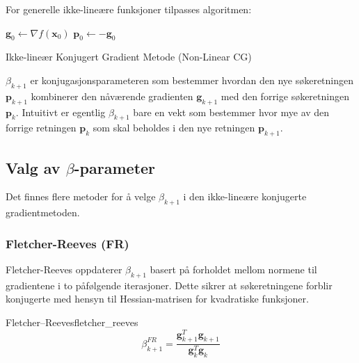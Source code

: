 For generelle ikke-lineære funksjoner tilpasses algoritmen:

\begin{algorithm}[H]
	\SetAlgoLined
	\(\symbf{g}_0 \gets \nabla f(\symbf{x}_0)\) 
	\(\symbf{p}_0 \gets -\symbf{g}_0\) 
	\caption{Ikke-lineær Konjugert Gradient Metode (Non-Linear CG)}
\end{algorithm}

\(\beta_{k+1}\) er konjugasjonsparameteren som bestemmer hvordan den nye søkeretningen \(\symbf{p}_{k+1}\) kombinerer den nåværende gradienten \(\symbf{g}_{k+1}\) med den forrige søkeretningen \(\symbf{p}_k\).
Intuitivt er egentlig \(\beta_{k+1}\) bare en vekt som bestemmer hvor mye av den forrige retningen \(\symbf{p}_k\) som skal beholdes i den nye retningen \(\symbf{p}_{k+1}\).

\subsection{Valg av \texorpdfstring{\(\beta\)}{beta}-parameter}
Det finnes flere metoder for å velge \(\beta_{k+1}\) i den ikke-lineære konjugerte gradientmetoden.

\subsubsection{Fletcher-Reeves (FR)}
Fletcher-Reeves oppdaterer \(\beta_{k+1}\) basert på forholdet mellom normene til gradientene i to påfølgende iterasjoner.
Dette sikrer at søkeretningene forblir konjugerte med hensyn til Hessian-matrisen for kvadratiske funksjoner.

\begin{definition}{Fletcher--Reeves}{fletcher_reeves}
	\[
		\beta_{k+1}^{FR} = \frac{\symbf{g}_{k+1}^T\symbf{g}_{k+1}}{\symbf{g}_k^T\symbf{g}_k} \tag{FR}
	\]
\end{definition}

